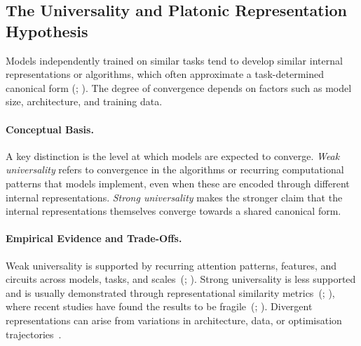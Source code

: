 \subsection{The Universality and Platonic Representation Hypothesis}
\label{subsec:universality}

\begin{definitionbox}
Models independently trained on similar tasks tend to develop similar internal representations or algorithms, which often approximate a task-determined canonical form (; ). The degree of convergence depends on factors such as model size, architecture, and training data.
\end{definitionbox}

\paragraph{Conceptual Basis.}
A key distinction is the level at which models are expected to converge. \emph{Weak universality} refers to convergence in the algorithms or recurring computational patterns that models implement, even when these are encoded through different internal representations. \emph{Strong universality} makes the stronger claim that the internal representations themselves converge towards a shared canonical form.

\paragraph{Empirical Evidence and Trade-Offs.}
Weak universality is supported by recurring attention patterns, features, and circuits across models, tasks, and scales~(; ). Strong universality is less supported and is usually demonstrated through representational similarity metrics~(; ), where recent studies have found the results to be fragile~(; ). Divergent representations can arise from variations in architecture, data, or optimisation trajectories~.

